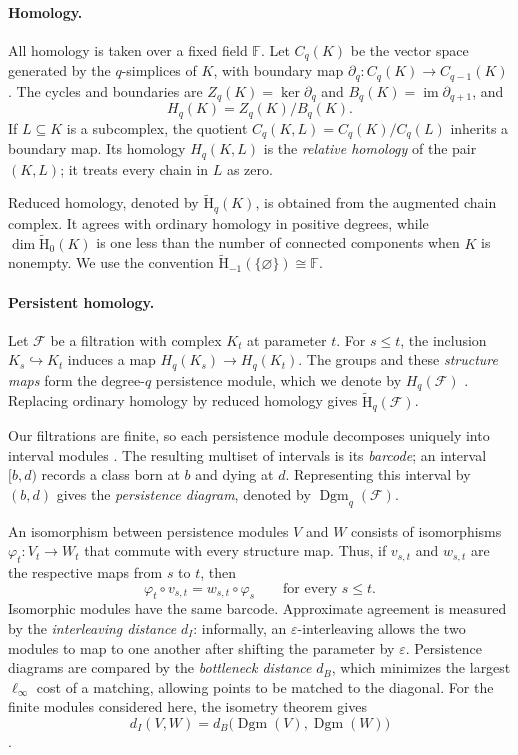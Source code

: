 \documentclass[11pt,letterpaper]{article}
\theoremstyle{definition}
\newcommand{\redH}{\widetilde{\mathrm H}}
\newcommand{\Dgm}{\operatorname{Dgm}}
\newcommand{\eps}{\varepsilon}
\begin{document}
\paragraph{Homology.}
All homology is taken over a fixed field $\mathbb F$. Let $C_q(K)$ be the
vector space generated by the $q$-simplices of $K$, with boundary map
$\partial_q:C_q(K)\to C_{q-1}(K)$. The cycles and boundaries are
$Z_q(K)=\ker\partial_q$ and $B_q(K)=\operatorname{im}\partial_{q+1}$, and
$$
H_q(K)=Z_q(K)/B_q(K).
$$
If $L\subseteq K$ is a subcomplex, the quotient
$C_q(K,L)=C_q(K)/C_q(L)$ inherits a boundary map. Its homology $H_q(K,L)$ is
the \emph{relative homology} of the pair $(K,L)$; it treats every chain in
$L$ as zero.

Reduced homology, denoted by $\redH_q(K)$, is obtained from the augmented
chain complex. It agrees with ordinary homology in positive degrees, while
$\dim\redH_0(K)$ is one less than the number of connected components when
$K$ is nonempty. We use the convention
$\redH_{-1}(\{\varnothing\})\cong\mathbb F$.

\paragraph{Persistent homology.}
Let $\mathcal F$ be a filtration with complex $K_t$ at parameter $t$. For
$s\leq t$, the inclusion $K_s\hookrightarrow K_t$ induces a map
$H_q(K_s)\to H_q(K_t)$. The groups and these \emph{structure maps} form the
degree-$q$ persistence module, which we denote by $H_q(\mathcal F)$
\cite{EdelsbrunnerLetscherZomorodian2002,ZomorodianCarlsson2005}. Replacing
ordinary homology by reduced homology gives $\redH_q(\mathcal F)$.

Our filtrations are finite, so each persistence module decomposes uniquely
into interval modules \cite{CrawleyBoevey2015}. The resulting multiset of
intervals is its \emph{barcode}; an interval $[b,d)$ records a class born at
$b$ and dying at $d$. Representing this interval by $(b,d)$ gives the
\emph{persistence diagram}, denoted by $\Dgm_q(\mathcal F)$.

An isomorphism between persistence modules $V$ and $W$ consists of
isomorphisms $\varphi_t:V_t\to W_t$ that commute with every structure map.
Thus, if $v_{s,t}$ and $w_{s,t}$ are the respective maps from $s$ to $t$, then
$$
\varphi_t\circ v_{s,t}=w_{s,t}\circ\varphi_s
\qquad\text{for every }s\leq t.
$$
Isomorphic modules have the same barcode. Approximate agreement is measured
by the \emph{interleaving distance} $d_I$: informally, an $\eps$-interleaving
allows the two modules to map to one another after shifting the parameter by
$\eps$. Persistence diagrams are compared by the \emph{bottleneck distance}
$d_B$, which minimizes the largest $\ell_\infty$ cost of a matching, allowing
points to be matched to the diagonal. For the finite modules considered here,
the isometry theorem gives
$$
d_I(V,W)=d_B\bigl(\Dgm(V),\Dgm(W)\bigr)
$$
\cite{ChazalEtAl2016,Lesnick2015}.
\end{document}
